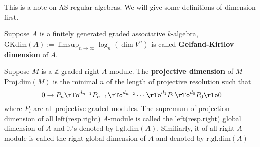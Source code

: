 This is a note on AS regular algebras. We will give some definitions of dimension first.
\begin{mydefn}
Suppose $A$ is a finitely generated graded associative $k$-algebra, $\mathrm{GKdim}(A):=\limsup_{n \to \infty}\log_{n}(\dim V^{n})$ is called \textbf{Gelfand-Kirilov dimension} of $A$.
\end{mydefn}
\begin{mydefn}
Suppose $M$ is a $\mathbb{Z}$-graded right $A$-module. The \textbf{projective dimension} of $M$ $\mathrm{Proj.dim}(M)$ is the minimal $n$ of the length of projective resolution such that 
\[
0 \rightarrow P_{n} \rTo^{d_{n-1}} P_{n-1} \rTo^{d_{n-2}} \cdots \rTo^{d_{1}} P_{1} \rTo^{d_{0}} P_{0} \rTo 0
\]
where $P_{i}$ are all projective graded modules.
The supremum of projection dimension of all left(resp.right) $A$-module is called the left(resp.right) global dimension of $A$ and it's denoted by $\mathrm{l.gl.dim}(A)$. Similiarly, it of all right $A$-module is called the right global dimension of $A$ and denoted by $\mathrm{r.gl.dim}(A)$
\end{mydefn}


